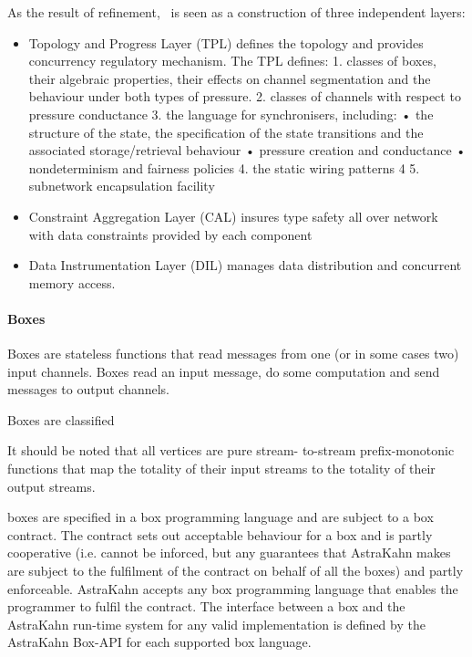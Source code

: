 As the result of refinement, \ak\ is seen as a construction of three independent layers:
\begin{itemize}
\item Topology and Progress Layer (TPL) defines the topology and provides concurrency regulatory mechanism.
The TPL defines:
1. classes of boxes, their algebraic properties, their effects on channel segmentation and the behaviour under both types of pressure.
2. classes of channels with respect to pressure conductance 3. the language for synchronisers, including:
• the structure of the state, the specification of the state transitions and the associated storage/retrieval behaviour
• pressure creation and conductance • nondeterminism and fairness policies
4. the static wiring patterns 4
5. subnetwork encapsulation facility

\item Constraint Aggregation Layer (CAL) insures type safety all over network with data constraints provided by each component

\item Data Instrumentation Layer (DIL) manages data distribution and concurrent memory access.
\end{itemize}



\paragraph{Boxes}
Boxes are stateless functions that read messages from one (or in some cases two) input channels. Boxes read an input message, do some computation and send messages to output channels.

Boxes are classified

It should be noted that all vertices are pure stream- to-stream prefix-monotonic functions that map the totality of their input streams to the totality of their output streams.

boxes are specified in a
box programming language and are subject to a box contract. The contract sets out acceptable behaviour for a box and is partly cooperative (i.e. cannot be inforced, but any guarantees that AstraKahn makes are subject to the fulfilment of the contract on behalf of all the boxes) and partly enforceable. AstraKahn accepts any box programming language that enables the programmer to fulfil the contract. The interface between a box and the AstraKahn run-time system for any valid implementation is defined by the AstraKahn Box-API for each supported box language.



